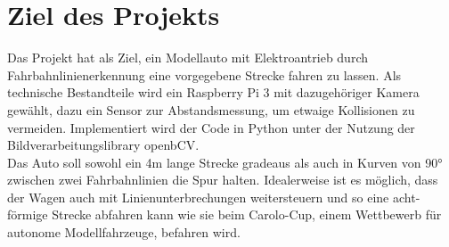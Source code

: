 \section{Ziel des Projekts}
Das Projekt hat als Ziel, ein Modellauto mit Elektroantrieb 
durch Fahrbahnlinienerkennung eine vorgegebene Strecke fahren zu lassen. Als
technische Bestandteile wird ein Raspberry Pi 3 mit dazugehöriger Kamera
gewählt, dazu ein Sensor zur Abstandsmessung, um etwaige Kollisionen zu
vermeiden. Implementiert wird der Code in Python unter der Nutzung der
Bildverarbeitungslibrary openbCV. \\
Das Auto soll  sowohl ein 4m lange Strecke gradeaus als auch in Kurven von 90° 
zwischen zwei Fahrbahnlinien die Spur halten. Idealerweise ist es möglich, dass 
der Wagen auch mit Linienunterbrechungen weitersteuern und so eine acht-förmige 
Strecke abfahren kann wie sie beim Carolo-Cup, einem Wettbewerb für autonome
Modellfahrzeuge, befahren wird.
